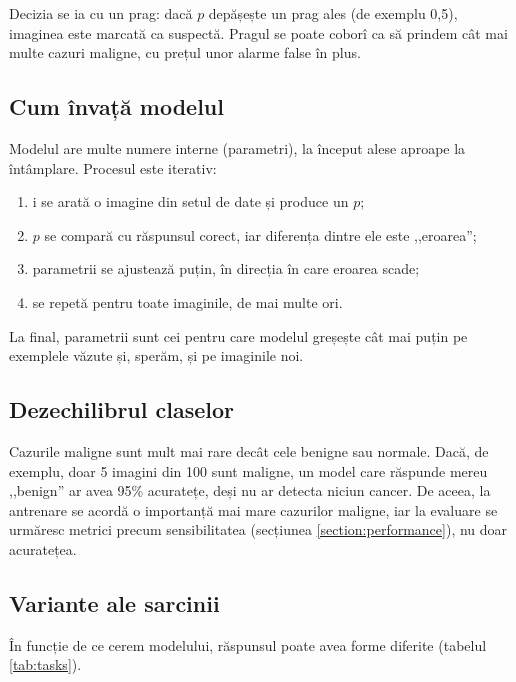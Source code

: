 \documentclass[runningheads,a4paper,11pt]{report}
\begin{document}
Decizia se ia cu un prag: dacă $p$ depășește un prag ales (de exemplu 0,5), imaginea este marcată ca suspectă. Pragul se poate coborî ca să prindem cât mai multe cazuri maligne, cu prețul unor alarme false în plus.

\subsection{Cum învață modelul}

Modelul are multe numere interne (parametri), la început alese aproape la întâmplare. Procesul este iterativ:
\begin{enumerate}
	\item i se arată o imagine din setul de date și produce un $p$;
	\item $p$ se compară cu răspunsul corect, iar diferența dintre ele este ,,eroarea'';
	\item parametrii se ajustează puțin, în direcția în care eroarea scade;
	\item se repetă pentru toate imaginile, de mai multe ori.
\end{enumerate}
La final, parametrii sunt cei pentru care modelul greșește cât mai puțin pe exemplele văzute și, sperăm, și pe imaginile noi.

\subsection{Dezechilibrul claselor}

Cazurile maligne sunt mult mai rare decât cele benigne sau normale. Dacă, de exemplu, doar 5 imagini din 100 sunt maligne, un model care răspunde mereu ,,benign'' ar avea 95\% acuratețe, deși nu ar detecta niciun cancer. De aceea, la antrenare se acordă o importanță mai mare cazurilor maligne, iar la evaluare se urmăresc metrici precum sensibilitatea (secțiunea \ref{section:performance}), nu doar acuratețea.

\subsection{Variante ale sarcinii}

În funcție de ce cerem modelului, răspunsul poate avea forme diferite (tabelul \ref{tab:tasks}).
\end{document}
